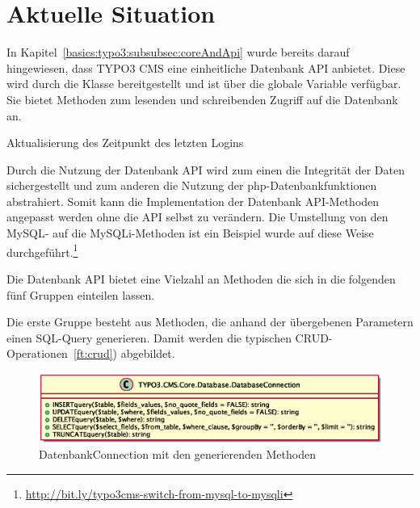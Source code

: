 \section{Aktuelle Situation}
\label{sec:currentSituation}
In Kapitel~\ref{basics:typo3:subsubsec:coreAndApi} wurde bereits darauf hingewiesen, dass TYPO3 CMS eine einheitliche Datenbank API anbietet. Diese wird durch die Klasse  bereitgestellt und ist über die globale Variable  verfügbar. Sie bietet Methoden zum lesenden und schreibenden Zugriff auf die Datenbank an.

\begin{listing}
	\caption{Aktualisierung des Zeitpunkt des letzten Logins}
	\label{lst:databaseOldExample}
\end{listing}

Durch die Nutzung der Datenbank API wird zum einen die Integrität der Daten sichergestellt und zum anderen die Nutzung der \gls{php}-Datenbankfunktionen abstrahiert. Somit kann die Implementation der Datenbank API-Methoden angepasst werden ohne die API selbst zu verändern. Die Umstellung von den MySQL- auf die MySQLi-Methoden ist ein Beispiel wurde auf diese Weise durchgeführt.\footnote{\url{http://bit.ly/typo3cms-switch-from-mysql-to-mysqli}}

Die Datenbank API bietet eine Vielzahl an Methoden die sich in die folgenden fünf Gruppen einteilen lassen.

Die erste Gruppe besteht aus Methoden, die anhand der übergebenen Parametern einen SQL-Query generieren. Damit werden die typischen CRUD-Operationen~\ref{ft:crud}) abgebildet.

\begin{figure}[H]
	\centering
	\includegraphics[scale=0.65]{gfx/uml/DatabaseConnectionCreationMethods.eps}
	\caption{DatenbankConnection mit den generierenden Methoden}
	\label{fig:databaseConnectionWithSQLGenerationMethods}
\end{figure}

